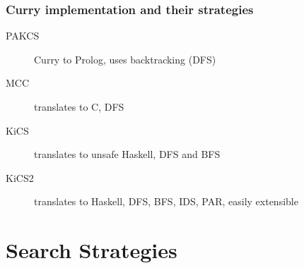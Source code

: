 \documentclass[
,hyperref={pdfpagelabels=false}
]{beamer}
\begin{document}
\begin{frame}[fragile]%
\frametitle{Curry implementation and their strategies}
\begin{description}
\item[PAKCS] Curry to Prolog, uses backtracking (DFS)
\item[MCC] translates to C, DFS
\item[KiCS] translates to unsafe Haskell, DFS and BFS
\item[KiCS2]translates to Haskell, DFS, BFS, IDS, PAR, easily extensible
\end{description}
\end{frame}

\section{Search Strategies}
\end{document}
